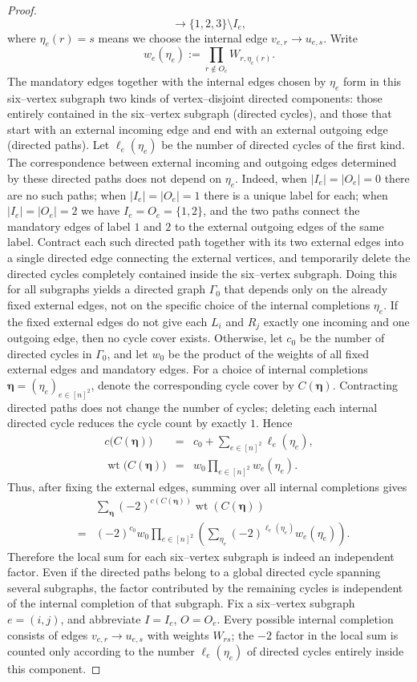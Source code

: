 \documentclass[10pt,a4paper]{amsart}
\begin{document}
\begin{proof}
\[  \longrightarrow\{1,2,3\}\setminus I_e,
\]
where $\eta_e(r)=s$ means we choose the internal edge $v_{e,r}\to u_{e,s}$. Write
\[
  w_e(\eta_e):=\prod_{r\notin O_e}W_{r,\eta_e(r)}.
\]
The mandatory edges together with the internal edges chosen by $\eta_e$ form in this six–vertex subgraph two kinds of vertex–disjoint directed components: those entirely contained in the six–vertex subgraph (directed cycles), and those that start with an external incoming edge and end with an external outgoing edge (directed paths). Let $\ell_e(\eta_e)$ be the number of directed cycles of the first kind.
The correspondence between external incoming and outgoing edges determined by these directed paths does not depend on $\eta_e$. Indeed, when $|I_e|=|O_e|=0$ there are no such paths; when $|I_e|=|O_e|=1$ there is a unique label for each; when $|I_e|=|O_e|=2$ we have $I_e=O_e=\{1,2\}$, and the two paths connect the mandatory edges of label $1$ and $2$ to the external outgoing edges of the same label. Contract each such directed path together with its two external edges into a single directed edge connecting the external vertices, and temporarily delete the directed cycles completely contained inside the six–vertex subgraph. Doing this for all subgraphs yields a directed graph $\Gamma_0$ that depends only on the already fixed external edges, not on the specific choice of the internal completions $\eta_e$.
If the fixed external edges do not give each $L_i$ and $R_j$ exactly one incoming and one outgoing edge, then no cycle cover exists. Otherwise, let $c_0$ be the number of directed cycles in $\Gamma_0$, and let $w_0$ be the product of the weights of all fixed external edges and mandatory edges. For a choice of internal completions $\boldsymbol\eta=(\eta_e)_{e\in[n]^2}$, denote the corresponding cycle cover by $C(\boldsymbol\eta)$. Contracting directed paths does not change the number of cycles; deleting each internal directed cycle reduces the cycle count by exactly $1$. Hence
\begin{eqnarray*}
  c\bigl(C(\boldsymbol\eta)\bigr)
  &=&c_0+\sum_{e\in[n]^2}\ell_e(\eta_e),\\
  \operatorname{wt}\bigl(C(\boldsymbol\eta)\bigr)
  &=&w_0\prod_{e\in[n]^2}w_e(\eta_e).
\end{eqnarray*}
Thus, after fixing the external edges, summing over all internal completions gives
\begin{eqnarray*}
 &&\sum_{\boldsymbol\eta}
 (-2)^{c(C(\boldsymbol\eta))}\operatorname{wt}(C(\boldsymbol\eta))\\
 &=&(-2)^{c_0}w_0
 \prod_{e\in[n]^2}\left(\sum_{\eta_e}
 (-2)^{\ell_e(\eta_e)}w_e(\eta_e)\right).
\end{eqnarray*}
Therefore the local sum for each six–vertex subgraph is indeed an independent factor. Even if the directed paths belong to a global directed cycle spanning several subgraphs, the factor contributed by the remaining cycles is independent of the internal completion of that subgraph.
Fix a six–vertex subgraph $e=(i,j)$, and abbreviate $I=I_e$, $O=O_e$. Every possible internal completion consists of edges $v_{e,r}\to u_{e,s}$ with weights $W_{rs}$; the $-2$ factor in the local sum is counted only according to the number $\ell_e(\eta_e)$ of directed cycles entirely inside this component.


\end{proof}
\end{document}
